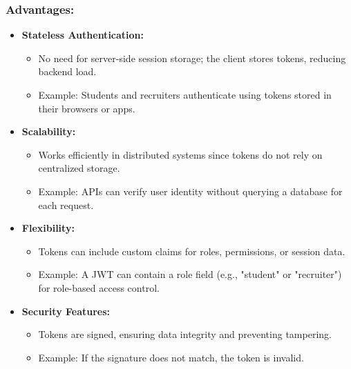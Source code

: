 \subsubsection*{Advantages:}
\begin{itemize}
    \item \textbf{Stateless Authentication:}
    \begin{itemize}
        \item No need for server-side session storage; the client stores tokens, reducing backend load.
        \item Example: Students and recruiters authenticate using tokens stored in their browsers or apps.
    \end{itemize}
    \item \textbf{Scalability:}
    \begin{itemize}
        \item Works efficiently in distributed systems since tokens do not rely on centralized storage.
        \item Example: APIs can verify user identity without querying a database for each request.
    \end{itemize}
    \item \textbf{Flexibility:}
    \begin{itemize}
        \item Tokens can include custom claims for roles, permissions, or session data.
        \item Example: A JWT can contain a role field (e.g., "student" or "recruiter") for role-based access control.
    \end{itemize}
    \item \textbf{Security Features:}
    \begin{itemize}
        \item Tokens are signed, ensuring data integrity and preventing tampering.
        \item Example: If the signature does not match, the token is invalid.
    \end{itemize}
\end{itemize}

